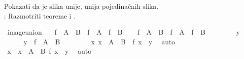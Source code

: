 %
\begin{isabellebody}%
%
%
\isadelimtheory
%
\endisadelimtheory
%
\isatagtheory
%
\endisatagtheory
{\isafoldtheory}%
%
\isadelimtheory
%
\endisadelimtheory
%
\begin{exercise}[subtitle=Svojstva funkcija]
%
\begin{isamarkuptext}%
Pokazati da je slika unije, unija pojedinačnih slika.\\
      : Razmotriti teoreme  i .%
\end{isamarkuptext}\isamarkuptrue%
\isamarkupfalse%
\ image{\isacharunderscore}{\kern0pt}union{\isacharcolon}{\kern0pt}\isanewline
\ \ \ {\isachardoublequoteopen}f\ {\isacharbackquote}{\kern0pt}\ {\isacharparenleft}{\kern0pt}A\ {\isasymunion}\ B{\isacharparenright}{\kern0pt}\ {\isacharequal}{\kern0pt}\ f\ {\isacharbackquote}{\kern0pt}\ A\ {\isasymunion}\ f\ {\isacharbackquote}{\kern0pt}\ B{\isachardoublequoteclose}\isanewline
%
\isadelimproof
%
\endisadelimproof
%
\isatagproof
{}\isamarkupfalse%
\isanewline
\ \ \isamarkupfalse%
\ {\isachardoublequoteopen}f\ {\isacharbackquote}{\kern0pt}\ {\isacharparenleft}{\kern0pt}A\ {\isasymunion}\ B{\isacharparenright}{\kern0pt}\ {\isasymsubseteq}\ f\ {\isacharbackquote}{\kern0pt}\ A\ {\isasymunion}\ f\ {\isacharbackquote}{\kern0pt}\ B{\isachardoublequoteclose}\isanewline
\ \ \isamarkupfalse%
\isanewline
\ \ \ \ \isamarkupfalse%
\ y\isanewline
\ \ \ \ \isamarkupfalse%
\ {\isachardoublequoteopen}y\ {\isasymin}\ f\ {\isacharbackquote}{\kern0pt}\ {\isacharparenleft}{\kern0pt}A\ {\isasymunion}\ B{\isacharparenright}{\kern0pt}{\isachardoublequoteclose}\isanewline
\ \ \ \ \isamarkupfalse%
\ \isamarkupfalse%
\ {\isachardoublequoteopen}{\isasymexists}\ x{\isachardot}{\kern0pt}\ x\ {\isasymin}\ A\ {\isasymunion}\ B\ {\isasymand}\ f\ x\ {\isacharequal}{\kern0pt}\ y{\isachardoublequoteclose}\ \isamarkupfalse%
\ auto\isanewline
\ \ \ \ \isamarkupfalse%
\ \isamarkupfalse%
\ x\ \ {\isachardoublequoteopen}x\ {\isasymin}\ A\ {\isasymunion}\ B{\isachardoublequoteclose}\ {\isachardoublequoteopen}f\ x\ {\isacharequal}{\kern0pt}\ y{\isachardoublequoteclose}\ \isamarkupfalse%
\ auto\isanewline
\ \ \ \ \isamarkupfalse%
\ \isamarkupfalse%

\end{exercise}
\end{isabellebody}
